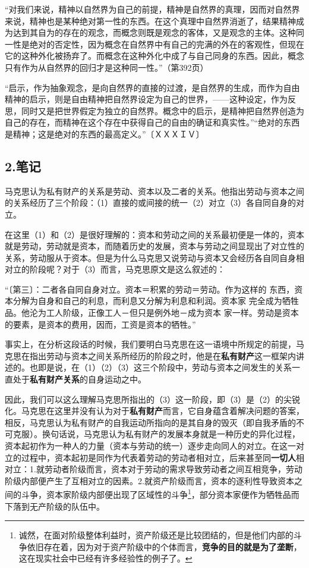 \documentclass[a4paper,twoside,12pt,AutoFakeBold]{ctexart}
\begin{document}
\begin{fangsong}
“对我们来说，精神以自然界为自己的前提，精神是自然界的真理，因而对自然界来说，精神也是某种绝对第一性的东西。在这个真理中自然界消逝了，结果精神成为达到其自为的存在的观念，而概念则既是观念的客体，又是观念的主体。这种同一性是绝对的否定性，因为概念在自然界中有自己的完满的外在的客观性，但现在它的这种外化被扬弃了。而概念在这种外化中成了与自己同身的东西。因此，概念只有作为从自然界的回归才是这种同一性。”（第392页）

“启示，作为抽象观念，是向自然界的直接的过渡，是自然界的生成，而作为自由精神的启示，则是自由精神把自然界设定为自己的世界，——这种设定，作为反思，同时又是把世界假定为独立的自然界。概念中的启示，是精神把自然界创造为自己的存在，而精神在这个存在中获得自己的自由的确证和真实性。”“绝对的东西是精神；这是绝对的东西的最高定义。”〔ＸＸＸＩＶ〕
\end{fangsong}

\newpage
\subsection{2.笔记}
马克思认为私有财产的关系是劳动、资本以及二者的关系。他指出劳动与资本之间的关系经历了三个阶段：（1）直接的或间接的统一（2）对立（3）各自同自身的对立。

在这里（1）和（2）是很好理解的：资本和劳动之间的关系最初便是一体的，资本就是劳动，劳动就是资本，而随着历史的发展，资本与劳动之间显现出了对立性的关系，劳动服从于资本。但是为什么马克思又说劳动与资本又会经历各自同自身相对立的阶段呢？对于（3）而言，马克思原文是这么叙述的：

\begin{fangsong}
    “〔第三〕：二者各自同自身对立。资本＝积累的劳动＝劳动。作为这样的
东西，资本分解为自身和自己的利息，而利息又分解为利息和利润。资本家
完全成为牺牲品。他沦为工人阶级，正像工人－但只是例外地－成为资本
家一样。劳动是资本的要素，是资本的费用，因而，工资是资本的牺牲。”
\end{fangsong}

事实上，在分析这段话的时候，我们要明白马克思在这一语境中所规定的前提，马克思在指出劳动与资本之间关系所经历的阶段之时，他是在\textbf{私有财产}这一框架内讲述的。也即是说，在（1）（2）（3）这三个阶段中，劳动与资本之间发生的关系一直处于\textbf{私有财产关系}的自身运动之中。

因此，我们可以这么理解马克思所指出的（3）这一阶段，即（3）是（2）的尖锐化。马克思在这里并没有认为对于\textbf{私有财产}而言，它自身蕴含着解决问题的答案，相反，马克思认为私有财产的自我运动所指向的是其自身的毁灭（即自我矛盾的不可克服）。换句话说，马克思认为私有财产的发展本身就是一种历史的异化过程，资本起初作为一种人的力量（资本与劳动的统一）逐步走向同人的对立。在这一对立的过程中，资本起初是同作为代表着劳动的劳动者相对立，后来甚至同\textbf{一切人}相对立：1.就劳动者阶级而言，资本对于劳动的需求导致劳动者之间互相竞争，劳动阶级内部便产生了互相对立的因素。2.就资产阶级而言，资本的逐利性导致资本之间的斗争，资本家阶级内部便出现了区域性的斗争\footnote{诚然，在面对阶级整体利益时，资产阶级还是比较团结的，但是他们内部的斗争依旧存在着，因为对于资产阶级中的个体而言，\textbf{竞争的目的就是为了垄断}，这在现实社会中已经有许多经验性的例子了。}，部分资本家便作为牺牲品而下落到无产阶级的队伍中。
\end{document}
